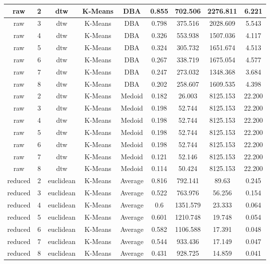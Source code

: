 \documentclass[9pt,journal,compsoc]{IEEEtran}
\begin{document}
\begin{table}[t]
\begin{tabular}{|c|c|c|c|c|c|c|c|c|}
		raw & 2 & dtw & K-Means & DBA & 0.855 & 702.506 & 2276.811 & 6.221 \\ \hline
		raw & 3 & dtw & K-Means & DBA & 0.798 & 375.516 & 2028.609 & 5.543 \\ \hline
		raw & 4 & dtw & K-Means & DBA & 0.326 & 553.938 & 1507.036 & 4.117 \\ \hline
		raw & 5 & dtw & K-Means & DBA & 0.324 & 305.732 & 1651.674 & 4.513 \\ \hline
		raw & 6 & dtw & K-Means & DBA & 0.267 & 338.719 & 1675.054 & 4.577 \\ \hline
		raw & 7 & dtw & K-Means & DBA & 0.247 & 273.032 & 1348.368 & 3.684 \\ \hline
		raw & 8 & dtw & K-Means & DBA & 0.202 & 258.607 & 1609.535 & 4.398 \\ \hline
		raw & 2 & dtw & K-Means & Medoid & 0.182 & 26.003 & 8125.153 & 22.200 \\ \hline
		raw & 3 & dtw & K-Means & Medoid & 0.198 & 52.744 & 8125.153 & 22.200 \\ \hline
		raw & 4 & dtw & K-Means & Medoid & 0.198 & 52.744 & 8125.153 & 22.200 \\ \hline
		raw & 5 & dtw & K-Means & Medoid & 0.198 & 52.744 & 8125.153 & 22.200 \\ \hline
		raw & 6 & dtw & K-Means & Medoid & 0.198 & 52.744 & 8125.153 & 22.200 \\ \hline
		raw & 7 & dtw & K-Means & Medoid & 0.121 & 52.146 & 8125.153 & 22.200 \\ \hline
		raw & 8 & dtw & K-Means & Medoid & 0.114 & 50.424 & 8125.153 & 22.200 \\ \hline
   		reduced & 2 & euclidean & K-Means & Average & 0.816 & 792.141 & 89.63 & 0.245 \\ \hline
        reduced & 3 & euclidean & K-Means & Average & 0.522 & 763.976 & 56.256 & 0.154 \\ \hline
        reduced & 4 & euclidean & K-Means & Average & 0.6 & 1351.579 & 23.333 & 0.064 \\ \hline
        reduced & 5 & euclidean & K-Means & Average & 0.601 & 1210.748 & 19.748 & 0.054 \\ \hline
        reduced & 6 & euclidean & K-Means & Average & 0.582 & 1106.588 & 17.391 & 0.048 \\ \hline
        reduced & 7 & euclidean & K-Means & Average & 0.544 & 933.436 & 17.149 & 0.047 \\ \hline
        reduced & 8 & euclidean & K-Means & Average & 0.431 & 928.725 & 14.859 & 0.041 \\ \hline

\end{tabular}
\end{table}
\end{document}
